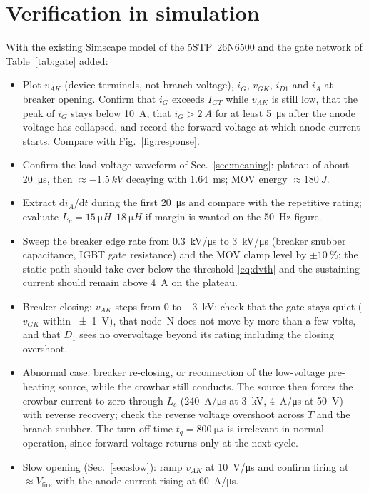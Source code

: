 \documentclass[11pt,a4paper]{article}
\begin{document}
\section{Verification in simulation}
\label{sec:verif}

With the existing Simscape model of the 5STP~26N6500 and the gate network of
Table~\ref{tab:gate} added:

\begin{itemize}
\item Plot $v_{AK}$ (device terminals, not branch voltage), $i_G$, $v_{GK}$, $i_{D1}$ and $i_A$
      at breaker opening. Confirm that $i_G$ exceeds $I_{GT}$ while $v_{AK}$ is still low, that
      the peak of $i_G$ stays below \SI{10}{A}, that $i_G > \SI{2}{A}$ for at least
      \SI{5}{\micro s} after the anode voltage has collapsed, and record the forward voltage at
      which anode current starts. Compare with Fig.~\ref{fig:response}.
\item Confirm the load-voltage waveform of Sec.~\ref{sec:meaning}: plateau of about
      \SI{20}{\micro s}, then $\approx \SI{-1.5}{kV}$ decaying with \SI{1.64}{ms}; MOV energy
      $\approx \SI{180}{J}$.
\item Extract $\mathrm{d}i_A/\mathrm{d}t$ during the first \SI{20}{\micro s} and compare with the
      repetitive rating; evaluate $L_c = \SIrange{15}{18}{\micro H}$ if margin is wanted on the
      \SI{50}{Hz} figure.
\item Sweep the breaker edge rate from \SI{0.3}{kV/\micro s} to \SI{3}{kV/\micro s} (breaker
      snubber capacitance, IGBT gate resistance) and the MOV clamp level by $\pm\SI{10}{\percent}$;
      the static path should take over below the threshold \eqref{eq:dvth} and the sustaining
      current should remain above \SI{4}{A} on the plateau.
\item Breaker closing: $v_{AK}$ steps from \SI{0}{} to \SI{-3}{kV}; check that the gate stays
      quiet ($v_{GK}$ within \SI{\pm 1}{V}), that node~N does not move by more than a few volts,
      and that $D_1$ sees no overvoltage beyond its rating including the closing overshoot.
\item Abnormal case: breaker re-closing, or reconnection of the low-voltage pre-heating source,
      while the crowbar still conducts. The source then forces the crowbar current to zero
      through $L_c$ (\SI{240}{A/\micro s} at \SI{3}{kV}, \SI{4}{A/\micro s} at \SI{50}{V}) with
      reverse recovery; check the reverse voltage overshoot across $T$ and the branch snubber. The
      turn-off time $t_q = \SI{800}{\micro s}$ is irrelevant in normal operation, since forward
      voltage returns only at the next cycle.
\item Slow opening (Sec.~\ref{sec:slow}): ramp $v_{AK}$ at \SI{10}{V/\micro s} and confirm firing
      at $\approx V_{\mathrm{fire}}$ with the anode current rising at \SI{60}{A/\micro s}.
\end{itemize}
\end{document}
